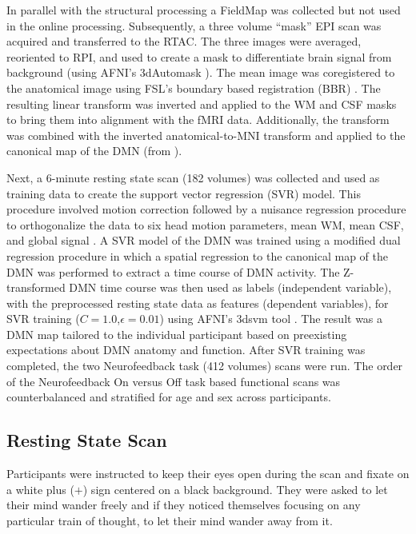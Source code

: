 In parallel with the structural processing a FieldMap was collected but not used in the online processing. Subsequently, a three volume ``mask'' EPI scan was acquired and transferred to the RTAC. The three images were averaged, reoriented to RPI, and used to create a mask to differentiate brain signal from background (using AFNI's 3dAutomask \cite{Cox_1996}). The mean image was coregistered to the anatomical image using FSL's boundary based registration (BBR) \cite{Greve2009}. The resulting linear transform was inverted and applied to the WM and CSF masks to bring them into alignment with the fMRI data. Additionally, the transform was combined with the inverted anatomical-to-MNI transform and applied to the canonical map of the DMN (from \cite{Smith2009a}).

Next, a 6-minute resting state scan (182 volumes) was collected and used as training data to create the support vector regression (SVR) model. This procedure involved motion correction followed by a nuisance regression procedure to orthogonalize the data to six head motion parameters, mean WM, mean CSF, and global signal \cite{Fox_2005,Friston1996,Lund_2006}. A SVR model of the DMN was trained using a modified dual regression procedure in which a spatial regression to the canonical map of the DMN was performed to extract a time course of DMN activity. The Z-transformed DMN time course was then used as labels (independent variable), with the preprocessed resting state data as features (dependent variables), for SVR training ($C=1.0$,$ \epsilon = 0.01$) using AFNI's 3dsvm tool \cite{Laconte_2005}. The result was a DMN map tailored to the individual participant based on preexisting expectations about DMN anatomy and function. After SVR training was completed, the two Neurofeedback task (412 volumes) scans were run.  The order of the Neurofeedback On versus Off task based functional scans was counterbalanced and stratified for age and sex across participants.


\subsection{Resting State Scan}

Participants were instructed to keep their eyes open during the scan and fixate on a white plus ($+$) sign centered on a black background. They were asked to let their mind wander freely and if they noticed themselves focusing on any particular train of thought, to let their mind wander away from it.

